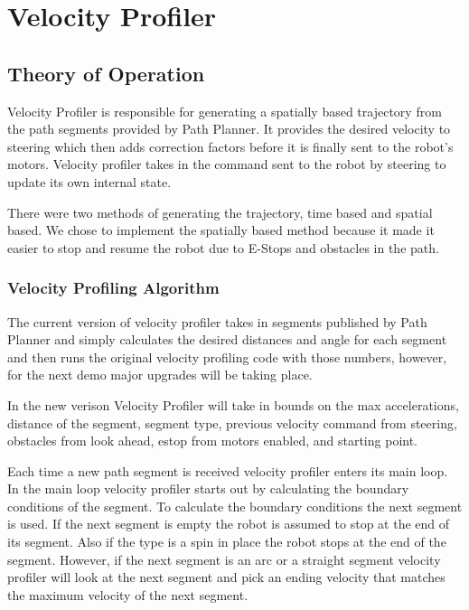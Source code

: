 \section{Velocity Profiler}

\subsection{Theory of Operation}

Velocity Profiler is responsible for generating a spatially based
trajectory from the path segments provided by Path Planner.  It
provides the desired velocity to steering which then adds correction
factors before it is finally sent to the robot's motors.  Velocity
profiler takes in the command sent to the robot by steering to update
its own internal state.

There were two methods of generating the trajectory, time based and
spatial based.  We chose to implement the spatially based method
because it made it easier to stop and resume the robot due to E-Stops
and obstacles in the path.

\subsubsection{Velocity Profiling Algorithm}

The current version of velocity profiler takes in segments published
by Path Planner and simply calculates the desired distances and angle
for each segment and then runs the original velocity profiling code
with those numbers, however, for the next demo major upgrades will be
taking place.

In the new verison Velocity Profiler will take in bounds on the max accelerations, distance
of the segment, segment type, previous velocity command from steering,
obstacles from look ahead, estop from motors enabled, and starting
point.

Each time a new path segment is received velocity profiler enters its
main loop.  In the main loop velocity profiler starts out by
calculating the boundary conditions of the segment.  To calculate the
boundary conditions the next segment is used.  If the next segment is
empty the robot is assumed to stop at the end of its segment.  Also if
the type is a spin in place the robot stops at the end of the
segment.  However, if the next segment is an arc or a straight segment
velocity profiler will look at the next segment and pick an ending
velocity that matches the maximum velocity of the next segment.

